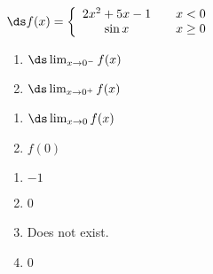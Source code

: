 {$\ds f(x) = \left\{\begin{array}{ccc}
	2x^2+5x-1 & & x<0 \\
	\sin x & & x\geq 0
	\end{array}
	\right.
$

\noindent\begin{minipage}[t]{.5\linewidth}
\begin{enumerate}
\item		$\ds \lim_{x\to 0^-} f(x)$
\item		$\ds \lim_{x\to 0^+} f(x)$
\end{enumerate}
\end{minipage}
\noindent\begin{minipage}[t]{.5\linewidth}
\begin{enumerate}\addtocounter{enumii}{2}
\item		$\ds \lim_{x\to 0} f(x)$
\item		$f(0)$\end{enumerate}
\end{minipage}
}
{\begin{enumerate}
\item		$-1$
\item		0
\item		Does not exist.
\item		0
\end{enumerate}
}


